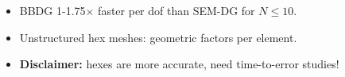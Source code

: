 \documentclass[compress]{beamer}
\begin{document}
{\begin{figure}
\end{figure}
\vspace{-1em}
\begin{itemize}
\item BBDG 1-1.75$\times$ faster per dof than SEM-DG for $N \leq 10$.
\item Unstructured hex meshes:  geometric factors per element.
\item \textbf{Disclaimer:} hexes are more accurate, need time-to-error studies!  
\end{itemize}
\let\thefootnote\relax{}
}
\end{document}
